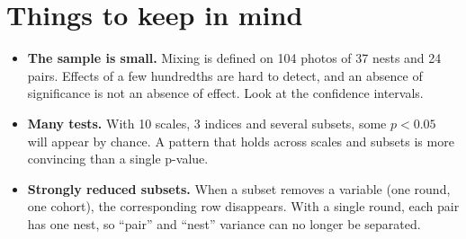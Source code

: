 \documentclass[11pt,a4paper]{article}
\begin{document}
\section{Things to keep in mind}
\begin{itemize}
\item \textbf{The sample is small.} Mixing is defined on 104 photos of 37 nests and 24 pairs. Effects of a few hundredths are hard to detect,
      and an absence of significance is not an absence of effect. Look at the confidence intervals.
\item \textbf{Many tests.} With 10 scales, 3 indices and several subsets, some $p < 0.05$ will appear by chance.
      A pattern that holds across scales and subsets is more convincing than a single p-value.
\item \textbf{Strongly reduced subsets.} When a subset removes a variable (one round, one cohort), the corresponding row disappears.
      With a single round, each pair has one nest, so ``pair'' and ``nest'' variance can no longer be separated.
\end{itemize}
\end{document}
